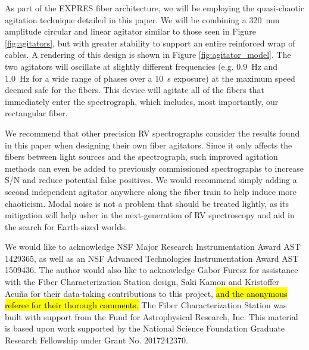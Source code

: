 \documentclass[twocolumn]{emulateapj}
\begin{document}
As part of the EXPRES fiber architecture, we will be employing the quasi-chaotic agitation technique detailed in this paper. We will be combining a \SI{320}{\milli\meter} amplitude circular and linear agitator similar to those seen in Figure \ref{fig:agitators}, but with greater stability to support an entire reinforced wrap of cables. A rendering of this design is shown in Figure \ref{fig:agitator_model}. The two agitators will oscillate at slightly different frequencies (e.g. \SI{0.9}{\hertz} and \SI{1.0}{\hertz} for a wide range of phases over a \SI{10}{\second} exposure) at the maximum speed deemed safe for the fibers. This device will agitate all of the fibers that immediately enter the spectrograph, which includes, most importantly, our rectangular fiber.

We recommend that other precision RV spectrographs consider the results found in this paper when designing their own fiber agitators. Since it only affects the fibers between light sources and the spectrograph, such improved agitation methods can even be added to previously commissioned spectrographs to increase S/N and reduce potential false positives. We would recommend simply adding a second independent agitator anywhere along the fiber train to help induce more chaoticism. Modal noise is not a problem that should be treated lightly, as its mitigation will help usher in the next-generation of RV spectroscopy and aid in the search for Earth-sized worlds.

\acknowledgments

We would like to acknowledge NSF Major Research Instrumentation Award AST 1429365, as well as an NSF Advanced Technologies Instrumentation Award AST 1509436. The author would also like to acknowledge Gabor Furesz for assistance with the Fiber Characterization Station design, Saki Kamon and Kristoffer Acu\~na for their data-taking contributions to this project, \hl{and the anonymous referee for their thorough comments.} The Fiber Characterization Station was built with support from the Fund for Astrophysical Research, Inc. This material is based upon work supported by the National Science Foundation Graduate Research Fellowship under Grant No. 2017242370.

\end{document}
